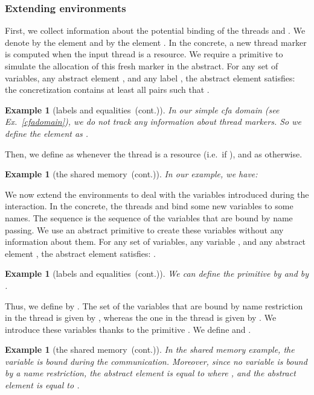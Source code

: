 \documentclass{article}
\newcommand{\boxexample}{}
\newtheorem{example}[thm]{Example}
\newcommand{\continued}{(cont.)}
\newcommand{\cfadomain}{labels and equalities}
\newcommand{\ccfadomain}{\cfadomain\ \continued}
\newcommand{\shareanalysis}{the shared memory}
\newcommand{\cflowanalysis}{\shareanalysis\ \continued}
\begin{document}
\subsubsection{Extending environments}
First, we collect information about the potential binding of the  threads  and . We denote by  the element  and by  the element . 
In the concrete, a new thread marker is computed when the input thread is a resource. 
We require a primitive  to simulate the allocation of this fresh marker in the abstract. 
For any set  of variables, any abstract element , and any label , the abstract element  satisfies: the concretization  
contains at least all pairs  such that 
 .

\begin{example}[\ccfadomain]
In our simple \emph{cfa} domain (see Ex.~\ref{cfadomain}), 
we do not track any information about thread markers.
So we define the element  as .
\boxexample\end{example}

Then, we define  as  whenever the thread  is a resource (i.e.~if ), and 
 as  otherwise.

\begin{example}[\cflowanalysis]
In our example, we have:

\boxexample\end{example}

We now extend the environments to deal with the variables introduced during the interaction.
In the concrete, the threads  and   bind some new variables to some names. 
The sequence  is the sequence of the variables that are bound by name passing.
We use an abstract primitive  to create these variables without any information about them. 
For any set  of variables, any variable , and any abstract element , the abstract element  satisfies: . 

\begin{example}[\ccfadomain]
We can define the primitive  by  and by . 
\boxexample\end{example}

Thus,  we define  by . The set of the variables that are 
bound by name restriction in the thread  is given by , whereas the one in the thread  is given by . We introduce these variables thanks to the primitive . We define  and  .

\begin{example}[\cflowanalysis]
In the shared memory example, the variable  is bound during the communication. 
Moreover, since  no variable is bound by a name restriction, the abstract element 
 is equal to   
where , and the abstract element 
 is equal to .
\boxexample\end{example}
\end{document}
